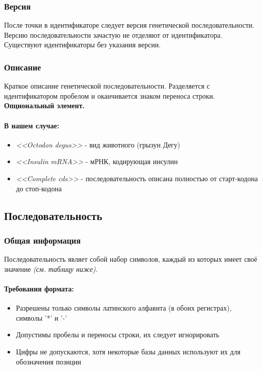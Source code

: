\documentclass{article}
\begin{document}
                \subsubsection{Версия}
                    После точки в идентификаторе следует версия генетической последовательности. Версию последовательности зачастую не отделяют от идентификатора. Существуют идентификаторы без указания версии.
                \subsubsection{Описание}
                    Краткое описание генетической последовательности. Разделяется с идентификатором пробелом и оканчивается знаком переноса строки.\\
                    \textbf{Опциональный элемент.}
                    \paragraph{В нашем случае:}
                        \begin{itemize}
                          \item \emph{<<Octodon degus>>} - вид животного (грызун Дегу)
                          \item \emph{<<Insulin mRNA>>} - мРНК, кодирующая инсулин
                          \item \emph{<<Complete cds>>} - последовательность описана полностью от старт-кодона до стоп-кодона
                        \end{itemize}
            \subsection{Последовательность}
                \subsubsection{Общая информация}
                    Последовательность являет собой набор символов, каждый из которых имеет своё значение \emph{(см. таблицу ниже)}.
                    \paragraph{Требования формата:}
                        \begin{itemize}
                          \item Разрешены только символы латинского алфавита (в обоих регистрах), символы '*' и '-'
                          \item Допустимы пробелы и переносы строки, их следует игнорировать
                          \item Цифры не допускаются, хотя некоторые базы данных используют их для обозначения позиции
                        \end{itemize}
\end{document}
